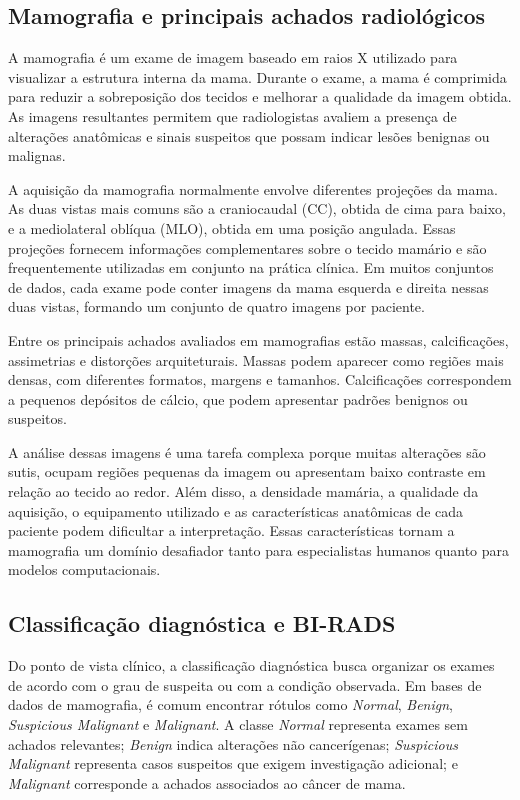\documentclass[
    12pt,
    openright,
    oneside,
    a4paper,
    english,
    brazil
]{abntex2}
\begin{document}
\subsection{Mamografia e principais achados radiológicos}

A mamografia é um exame de imagem baseado em raios X utilizado para visualizar a estrutura interna da mama. Durante o exame, a mama é comprimida para reduzir a sobreposição dos tecidos e melhorar a qualidade da imagem obtida. As imagens resultantes permitem que radiologistas avaliem a presença de alterações anatômicas e sinais suspeitos que possam indicar lesões benignas ou malignas.

A aquisição da mamografia normalmente envolve diferentes projeções da mama. As duas vistas mais comuns são a craniocaudal (CC), obtida de cima para baixo, e a mediolateral oblíqua (MLO), obtida em uma posição angulada. Essas projeções fornecem informações complementares sobre o tecido mamário e são frequentemente utilizadas em conjunto na prática clínica. Em muitos conjuntos de dados, cada exame pode conter imagens da mama esquerda e direita nessas duas vistas, formando um conjunto de quatro imagens por paciente.

Entre os principais achados avaliados em mamografias estão massas, calcificações, assimetrias e distorções arquiteturais. Massas podem aparecer como regiões mais densas, com diferentes formatos, margens e tamanhos. Calcificações correspondem a pequenos depósitos de cálcio, que podem apresentar padrões benignos ou suspeitos. 

A análise dessas imagens é uma tarefa complexa porque muitas alterações são sutis, ocupam regiões pequenas da imagem ou apresentam baixo contraste em relação ao tecido ao redor. Além disso, a densidade mamária, a qualidade da aquisição, o equipamento utilizado e as características anatômicas de cada paciente podem dificultar a interpretação. Essas características tornam a mamografia um domínio desafiador tanto para especialistas humanos quanto para modelos computacionais.

\subsection{Classificação diagnóstica e BI-RADS}

Do ponto de vista clínico, a classificação diagnóstica busca organizar os exames de acordo com o grau de suspeita ou com a condição observada. Em bases de dados de mamografia, é comum encontrar rótulos como \textit{Normal}, \textit{Benign}, \textit{Suspicious Malignant} e \textit{Malignant}. A classe \textit{Normal} representa exames sem achados relevantes; \textit{Benign} indica alterações não cancerígenas; \textit{Suspicious Malignant} representa casos suspeitos que exigem investigação adicional; e \textit{Malignant} corresponde a achados associados ao câncer de mama.
\end{document}
